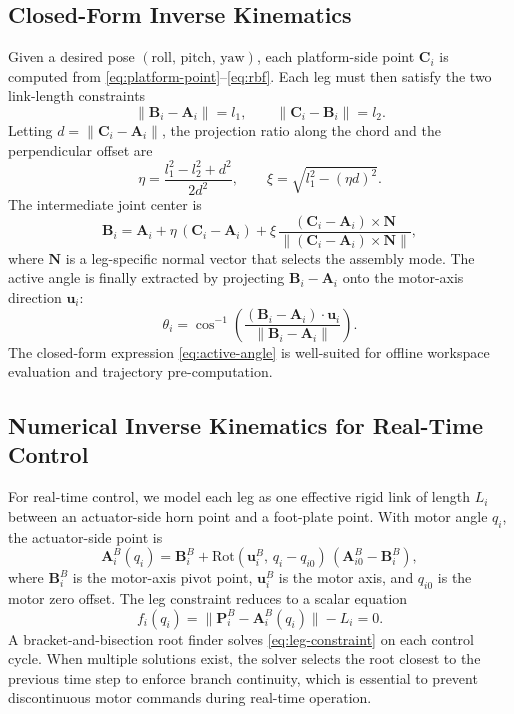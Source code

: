 \documentclass[conference]{IEEEtran}
\begin{document}
\subsection{Closed-Form Inverse Kinematics}

Given a desired pose $(\mathrm{roll},\,\mathrm{pitch},\,\mathrm{yaw})$, each platform-side point $\mathbf{C}_i$ is computed from \eqref{eq:platform-point}--\eqref{eq:rbf}. Each leg must then satisfy the two link-length constraints
\begin{equation}
\|\mathbf{B}_i-\mathbf{A}_i\|=l_1,\qquad
\|\mathbf{C}_i-\mathbf{B}_i\|=l_2.
\label{eq:linkconstraints}
\end{equation}
Letting $d=\|\mathbf{C}_i-\mathbf{A}_i\|$, the projection ratio along the chord and the perpendicular offset are
\begin{equation}
\eta=\frac{l_1^2-l_2^2+d^2}{2d^2},\qquad
\xi=\sqrt{l_1^2-(\eta d)^2}.
\end{equation}
The intermediate joint center is
\begin{equation}
\mathbf{B}_i=\mathbf{A}_i+\eta\,(\mathbf{C}_i-\mathbf{A}_i)+\xi\,\frac{(\mathbf{C}_i-\mathbf{A}_i)\times \mathbf{N}}{\|(\mathbf{C}_i-\mathbf{A}_i)\times \mathbf{N}\|},
\end{equation}
where $\mathbf{N}$ is a leg-specific normal vector that selects the assembly mode. The active angle is finally extracted by projecting $\mathbf{B}_i-\mathbf{A}_i$ onto the motor-axis direction $\mathbf{u}_i$:
\begin{equation}
\theta_i=\cos^{-1}\!\left(\frac{(\mathbf{B}_i-\mathbf{A}_i)\cdot \mathbf{u}_i}{\|\mathbf{B}_i-\mathbf{A}_i\|}\right).
\label{eq:active-angle}
\end{equation}
The closed-form expression \eqref{eq:active-angle} is well-suited for offline workspace evaluation and trajectory pre-computation.

\subsection{Numerical Inverse Kinematics for Real-Time Control}

For real-time control, we model each leg as one effective rigid link of length $L_i$ between an actuator-side horn point and a foot-plate point. With motor angle $q_i$, the actuator-side point is
\begin{equation}
\mathbf{A}_i^B(q_i)=\mathbf{B}_i^B+\mathrm{Rot}(\mathbf{u}_i^B,\,q_i-q_{i0})\,(\mathbf{A}_{i0}^B-\mathbf{B}_i^B),
\end{equation}
where $\mathbf{B}_i^B$ is the motor-axis pivot point, $\mathbf{u}_i^B$ is the motor axis, and $q_{i0}$ is the motor zero offset. The leg constraint reduces to a scalar equation
\begin{equation}
f_i(q_i)=\|\mathbf{P}_i^B-\mathbf{A}_i^B(q_i)\|-L_i=0.
\label{eq:leg-constraint}
\end{equation}
A bracket-and-bisection root finder solves \eqref{eq:leg-constraint} on each control cycle. When multiple solutions exist, the solver selects the root closest to the previous time step to enforce branch continuity, which is essential to prevent discontinuous motor commands during real-time operation.
\end{document}
